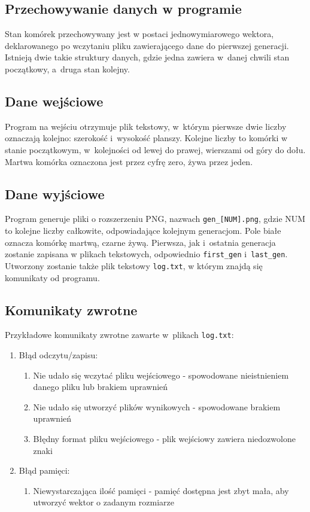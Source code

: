 \documentclass[a4paper,11pt]{article}
\begin{document}
			\subsection{Przechowywanie danych w programie}
				Stan komórek przechowywany jest w postaci jednowymiarowego wektora, deklarowanego po wczytaniu pliku zawierającego dane do pierwszej generacji. Istnieją dwie takie struktury danych, gdzie jedna zawiera w~danej chwili stan początkowy, a~druga stan kolejny.
			\subsection{Dane wejściowe}
				Program na wejściu otrzymuje plik tekstowy, w~którym pierwsze dwie liczby oznaczają kolejno: szerokość i~wysokość planszy. Kolejne liczby to komórki w stanie początkowym, w~kolejności od lewej do prawej, wierszami od góry do dołu. Martwa komórka oznaczona jest przez cyfrę zero, żywa przez jeden.
			\subsection{Dane wyjściowe}
				Program generuje pliki o rozszerzeniu PNG, nazwach \texttt{gen\_[NUM].png}, gdzie NUM to kolejne liczby całkowite, odpowiadające kolejnym generacjom. Pole białe oznacza komórkę martwą, czarne żywą. Pierwsza, jak i~ostatnia generacja zostanie zapisana w plikach tekstowych, odpowiednio \texttt{first\_gen} i~\texttt{last\_gen}. Utworzony zostanie także plik tekstowy \texttt{log.txt}, w którym znajdą się komunikaty od programu.	
			\subsection{Komunikaty zwrotne}
				Przykładowe komunikaty zwrotne zawarte w~plikach \texttt{log.txt}:
				\begin{enumerate}
				  \item Błąd odczytu/zapisu: 
				    \begin{enumerate}
				      \item Nie udało się wczytać pliku wejściowego - spowodowane nieistnieniem danego pliku lub brakiem uprawnień
				      \item Nie udało się utworzyć plików wynikowych - spowodowane brakiem uprawnień
				      \item Błędny format pliku wejściowego - plik wejściowy zawiera niedozwolone znaki
				    \end{enumerate}
				    \item Błąd pamięci:
				    \begin{enumerate}
				    	\item Niewystarczająca ilość pamięci - pamięć dostępna jest zbyt mała, aby utworzyć wektor o zadanym rozmiarze
				    \end{enumerate}
				\end{enumerate}
\end{document}

